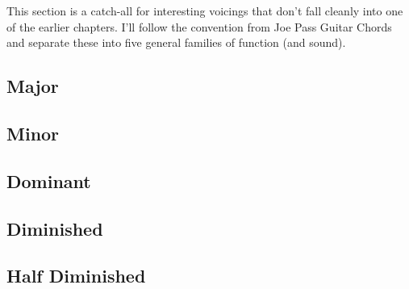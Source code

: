 
This section is a catch-all for interesting voicings that don't fall cleanly into one of the earlier chapters.  I'll follow the convention from Joe Pass Guitar Chords and separate these into five general families of function (and sound).

\subsection{Major}

\def\numfrets{6}

\subsection{Minor}


\subsection{Dominant}


\subsection{Diminished}

\subsection{Half Diminished}

